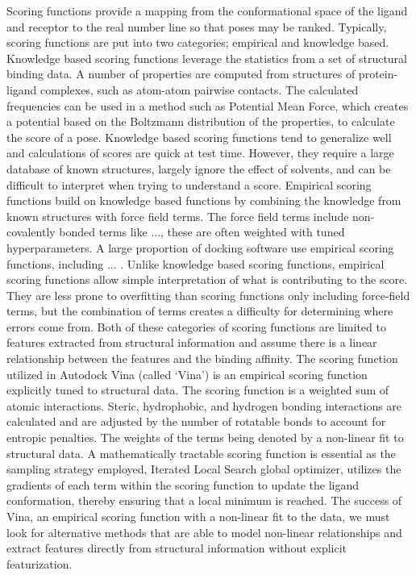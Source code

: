 \documentclass[journal=jcisd8,manuscript=article]{achemso}
\begin{document}
Scoring functions provide a mapping from the conformational space of the ligand and receptor to the real number line so that poses may be ranked. Typically, scoring functions are put into two categories; empirical and knowledge based. Knowledge based scoring functions leverage the statistics from a set of structural binding data. A number of properties are computed from structures of protein-ligand complexes, such as atom-atom pairwise contacts. The calculated frequencies can be used in a method such as Potential Mean Force, which creates a potential based on the Boltzmann distribution of the properties, to calculate the score of a pose. Knowledge based scoring functions tend to generalize well and calculations of scores are quick at test time. However, they require a large database of known structures, largely ignore the effect of solvents, and can be difficult to interpret when trying to understand a score. Empirical scoring functions build on knowledge based functions by combining the knowledge from known structures with force field terms. The force field terms include non-covalently bonded terms like ..., these are often weighted with tuned hyperparameters. A large proportion of docking software use empirical scoring functions, including ... \cite{}. Unlike knowledge based scoring functions, empirical scoring functions allow simple interpretation of what is contributing to the score. They are less prone to overfitting than scoring functions only including force-field terms, but the combination of terms creates a difficulty for determining where errors come from. Both of these categories of scoring functions are limited to features extracted from structural information and assume there is a linear relationship between the features and the binding affinity. The scoring function utilized in Autodock Vina (called `Vina') is an empirical scoring function explicitly tuned to structural data\cite{trott2010autodock}. The scoring function is a weighted sum of atomic interactions.  Steric, hydrophobic, and hydrogen bonding interactions are calculated and are adjusted by the number of rotatable bonds to account for entropic penalties.  The weights of the terms being denoted by a non-linear fit to structural data. A mathematically tractable scoring function is essential as the sampling strategy employed, Iterated Local Search global optimizer, utilizes the gradients of each term within the scoring function to update the ligand conformation, thereby ensuring that a local minimum is reached. The success of Vina, an empirical scoring function with a non-linear fit to the data, we must look for alternative methods that are able to model non-linear relationships and extract features directly from structural information without explicit featurization.
\end{document}
